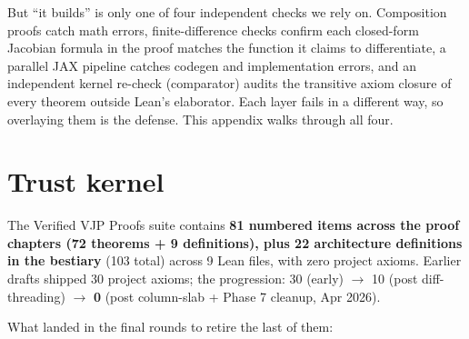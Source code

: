 But ``it builds'' is only one of four independent checks we rely on.
Composition proofs catch math errors, finite-difference checks confirm
each closed-form Jacobian formula in the proof matches the function it
claims to differentiate, a parallel JAX pipeline catches codegen and
implementation errors, and an independent kernel re-check (comparator)
audits the transitive axiom closure of every theorem outside Lean's
elaborator. Each layer fails in a different way, so overlaying them is
the defense. This appendix walks through all four.

\section{Trust kernel}

The Verified VJP Proofs suite contains \textbf{81 numbered items
across the proof chapters (72 theorems + 9 definitions), plus 22
architecture definitions in the bestiary} (103 total) across 9
Lean files, with zero project axioms. Earlier drafts shipped 30
project axioms; the progression: 30 (early) \(\to\) 10 (post
diff-threading) \(\to\) \textbf{0} (post column-slab + Phase 7
cleanup, Apr 2026).

What landed in the final rounds to retire the last of them:

